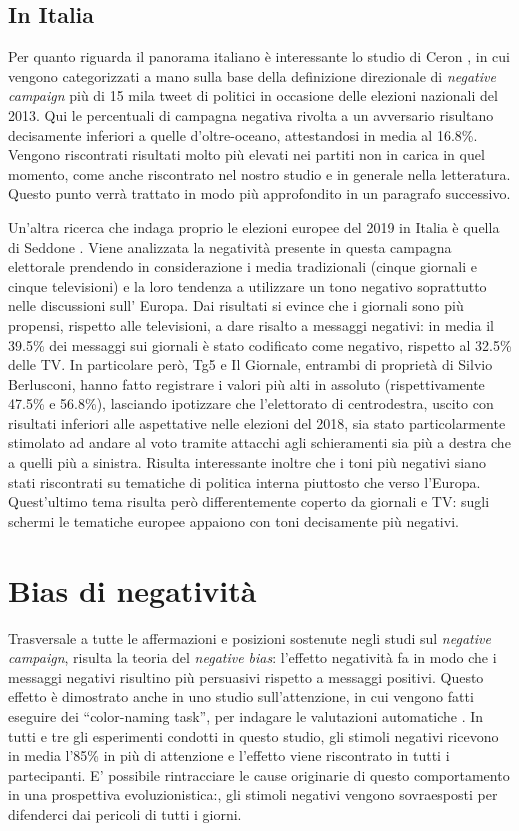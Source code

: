\subsection{In Italia}
Per quanto riguarda il panorama italiano è interessante lo studio di Ceron \citep{ceron2016}, in cui vengono categorizzati a mano sulla base della definizione direzionale di \textit{negative campaign} più di 15 mila tweet di politici in occasione delle elezioni nazionali del 2013. Qui le percentuali di campagna negativa rivolta a un avversario risultano decisamente inferiori a quelle d'oltre-oceano, attestandosi in media al 16.8\%. Vengono riscontrati risultati molto più elevati nei partiti non in carica in quel momento, come anche riscontrato nel nostro studio e in generale nella letteratura. Questo punto verrà trattato in modo più approfondito in un paragrafo successivo.

Un'altra ricerca che indaga proprio le elezioni europee del 2019 in Italia è quella di Seddone \citep{seddone2019}. Viene analizzata la negatività presente in questa campagna elettorale prendendo in considerazione i media tradizionali (cinque giornali e cinque televisioni) e la loro tendenza a utilizzare un tono negativo soprattutto nelle discussioni sull' Europa. Dai risultati si evince che i giornali sono più propensi, rispetto alle televisioni, a dare risalto a messaggi negativi: in media il 39.5\% dei messaggi sui giornali è stato codificato come negativo, rispetto al 32.5\% delle TV. In particolare però, Tg5 e Il Giornale, entrambi di proprietà di Silvio Berlusconi, hanno fatto registrare i valori più alti in assoluto (rispettivamente 47.5\% e 56.8\%), lasciando ipotizzare che l'elettorato di centrodestra, uscito con risultati inferiori alle aspettative nelle elezioni del 2018, sia stato particolarmente stimolato ad andare al voto tramite attacchi agli schieramenti sia più a destra che a quelli più a sinistra. Risulta interessante inoltre che i toni più negativi siano stati riscontrati su tematiche di politica interna piuttosto che verso l'Europa. Quest'ultimo tema risulta però differentemente coperto da giornali e TV: sugli schermi le tematiche europee appaiono con toni decisamente più negativi.

\section{Bias di negatività}
Trasversale a tutte le affermazioni e posizioni sostenute negli studi sul \textit{negative campaign}, risulta la teoria del \textit{negative bias}: l’effetto negatività fa in modo che i messaggi negativi risultino più persuasivi rispetto a messaggi positivi. Questo effetto è dimostrato anche in uno studio sull’attenzione, in cui vengono fatti eseguire dei “color-naming task”, per indagare le valutazioni automatiche \citep{pratto1991}. In tutti e tre gli esperimenti condotti in questo studio, gli stimoli negativi ricevono in media l’85\% in più di attenzione e l’effetto viene riscontrato in tutti i partecipanti. E’ possibile rintracciare  le cause originarie di questo comportamento in una prospettiva evoluzionistica:, gli stimoli negativi vengono sovraesposti per difenderci dai pericoli di tutti i giorni.

